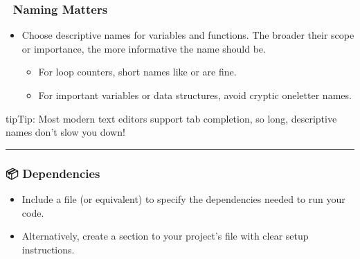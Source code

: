 \documentclass[letterpaper,10pt,english]{jupyterBook}
\begin{document}
\subsubsection{💬 Naming Matters}
\label{\detokenize{chapters/02/02a_coding-best-practices:naming-matters}}\begin{itemize}
\item {} 
\sphinxAtStartPar
{} Choose descriptive names for variables and functions. The broader their scope or importance, the more informative the name should be.
\begin{itemize}
\item {} 
\sphinxAtStartPar
For loop counters, short names like  or  are fine.

\item {} 
\sphinxAtStartPar
For important variables or data structures, avoid cryptic one\sphinxhyphen{}letter names.

\end{itemize}

\end{itemize}

\begin{sphinxadmonition}{tip}{Tip:}
\sphinxAtStartPar
{} Most modern text editors support tab completion, so long, descriptive names don’t slow you down!
\end{sphinxadmonition}


\bigskip\hrule\bigskip



\subsubsection{📦 Dependencies}
\label{\detokenize{chapters/02/02a_coding-best-practices:dependencies}}\begin{itemize}
\item {} 
\sphinxAtStartPar
{} Include a  file (or equivalent) to specify the dependencies needed to run your code.

\item {} 
\sphinxAtStartPar
Alternatively, create a  section to your project’s  file with clear setup instructions.

\end{itemize}
\end{document}
